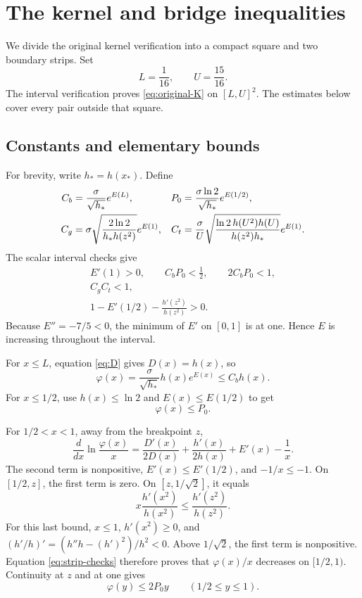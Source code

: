\documentclass[11pt]{article}
\theoremstyle{remark}
\begin{document}
\section{The kernel and bridge inequalities}\label{sec:kernel}

We divide the original kernel verification into a compact square
and two boundary strips. Set
\[
L=\frac1{16},\qquad U=\frac{15}{16}.
\]
The interval verification proves \eqref{eq:original-K} on \([L,U]^2\).
The estimates below cover every pair outside that square.

\subsection{Constants and elementary bounds}
For brevity, write \(h_*=h(x_*)\). Define
\begin{align}
C_b&=\frac{\sigma}{\sqrt{h_*}}e^{E(L)},&
P_0&=\frac{\sigma\ln2}{\sqrt{h_*}}e^{E(1/2)},\notag\\
C_g&=\sigma\sqrt{\frac{2\ln2}{h_*h(z^2)}}e^{E(1)},&
C_t&=\frac{\sigma}{U}
\sqrt{\frac{\ln2\,h(U^2)h(U)}{h(z^2)h_*}}e^{E(1)}.
\label{eq:strip-constants}
\end{align}
The scalar interval checks give
\begin{equation}\label{eq:strip-checks}
\begin{gathered}
E'(1)>0,\qquad
C_bP_0<\frac12,\qquad 2C_bP_0<1,\\
C_gC_t<1,\\
1-E'(1/2)-\frac{h'(z^2)}{h(z^2)}>0.
\end{gathered}
\end{equation}
Because \(E''=-7/5<0\), the minimum of \(E'\) on \([0,1]\) is at
one. Hence \(E\) is increasing throughout the interval.

For \(x\le L\), equation \eqref{eq:D} gives \(D(x)=h(x)\), so
\begin{equation}\label{eq:lower-profile}
\varphi(x)=\frac{\sigma}{\sqrt{h_*}}h(x)e^{E(x)}
\le C_bh(x).
\end{equation}
For \(x\le1/2\), use \(h(x)\le\ln2\) and \(E(x)\le E(1/2)\) to get
\begin{equation}\label{eq:P0}
\varphi(x)\le P_0.
\end{equation}

For \(1/2<x<1\), away from the breakpoint \(z\),
\[
\frac{d}{dx}\ln\frac{\varphi(x)}x
=\frac{D'(x)}{2D(x)}+\frac{h'(x)}{2h(x)}+E'(x)-\frac1x.
\]
The second term is nonpositive, \(E'(x)\le E'(1/2)\), and
\(-1/x\le-1\).
On \([1/2,z]\), the first term is zero.
On \([z,1/\sqrt2]\), it equals
\[
x\frac{h'(x^2)}{h(x^2)}
\le\frac{h'(z^2)}{h(z^2)}.
\]
For this last bound, \(x\le1\), \(h'(x^2)\ge0\), and
\((h'/h)'=(h''h-(h')^2)/h^2<0\).
Above \(1/\sqrt2\), the first term is nonpositive.
Equation \eqref{eq:strip-checks} therefore proves that
\(\varphi(x)/x\) decreases on \([1/2,1)\). Continuity at \(z\)
and at one gives
\begin{equation}\label{eq:linear-profile}
\varphi(y)\le2P_0y\qquad(1/2\le y\le1).
\end{equation}
\end{document}
